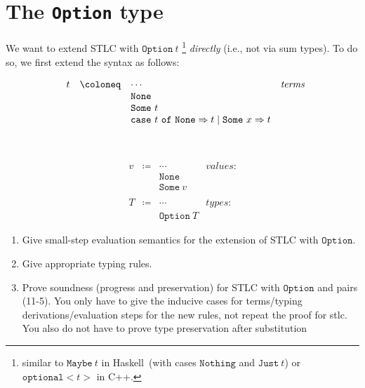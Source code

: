 \section{The \texttt{Option} type}
We want to extend STLC with $\mathtt{Option}\ t$
\footnote{similar to $\mathtt{Maybe}\ t$ in Haskell~(with cases $\mathtt{Nothing}$ and $\mathtt{Just}\ t$) or $\mathtt{optional<}t\mathtt{>}$ in C++.
} \emph{directly} (i.e., not via sum types). To do so, we first extend the syntax as follows:\\
\begin{minipage}{\textwidth}
  \begin{minipage}{0.45\textwidth}
    \[
      \begin{array}{rclr}
        t &\coloneq& \cdots &\emph{terms} \\
        &&\mathtt{None}&\textit{} \\
        &&\mathtt{Some}~t&\textit{} \\
        &&\mathtt{case}~t~\mathtt{of}~\mathtt{None}\Rightarrow t\mid\mathtt{Some}~x\Rightarrow t \\
        \phantom{\quad}\\
        \phantom{\quad}\\
      \end{array}
    \]
  \end{minipage}
  \hfill
  \begin{minipage}{0.45\textwidth}
    \[
      \begin{array}{rclr}
        v &\coloneq& \cdots&\textit{values:} \\
        &&\mathtt{None}&\textit{} \\
        &&\mathtt{Some}~v&\textit{} \\
        \\
        T &\coloneq& \cdots&\textit{types:} \\
        &&\mathtt{Option}~T&\textit{}
      \end{array}
    \]
  \end{minipage}
  \hfill
  \vspace{1em}
\end{minipage}

\begin{enumerate}
  \item Give small-step evaluation semantics for the extension of STLC with $\mathtt{Option}$.
  \item Give appropriate typing rules.
  \item Prove soundness (progress and preservation) for STLC with $\mathtt{Option}$ and pairs (11-5). You only have to give the inducive cases for terms/typing derivations/evaluation steps for the new rules, not repeat the proof for stlc. You also do not have to prove type preservation after substitution
\end{enumerate}

